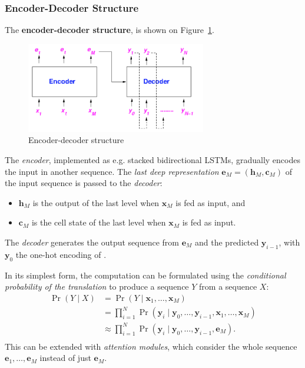 \subsubsection{Encoder-Decoder Structure}
The \textbf{encoder-decoder structure}, is shown on Figure~\ref{fig:encdec}.
\begin{figure}[!hbtp]
	\centering
	\includegraphics[width=0.7\textwidth]{img/encdec}
	\caption{Encoder-decoder structure}
	\label{fig:encdec}
\end{figure}
The \emph{encoder}, implemented as e.g. stacked bidirectional LSTMs, gradually encodes the input in another sequence.
The \emph{last deep representation} \(\bm{e}_M = (\bm{h}_M, \bm{c}_M)\) of the input sequence is passed to the \emph{decoder}:
\begin{itemize}
	\item \(\bm{h}_M\) is the output of the last level when \(\bm{x}_M\) is fed as input, and
	\item \(\bm{c}_M\) is the cell state of the last level when \(\bm{x}_M\) is fed as input.
\end{itemize}
The \emph{decoder} generates the output sequence from \(\bm{e}_M\) and the predicted \(\bm{y}_{i-1}\), with \(\bm{y}_0\) the one-hot encoding of \stoken.

In its simplest form, the computation can be formulated using the \emph{conditional probability of the translation} to produce a sequence \(Y\) from a sequence \(X\):
\begin{align*}
	\Pr(Y \mid X) &= \Pr(Y \mid \bm{x}_1, \dots, \bm{x}_M)\\
	&= \prod_{i=1}^N \Pr(\bm{y}_i \mid \bm{y}_0, \dots, \bm{y}_{i-1}, \bm{x}_1, \dots, \bm{x}_M)\\
	&\approx \prod_{i=1}^N \Pr(\bm{y}_i \mid \bm{y}_0, \dots, \bm{y}_{i-1}, \bm{e}_M).\\
\end{align*}
This can be extended with \emph{attention modules}, which consider the whole sequence \(\bm{e}_1, \dots, \bm{e}_M\) instead of just \(\bm{e}_M\).

